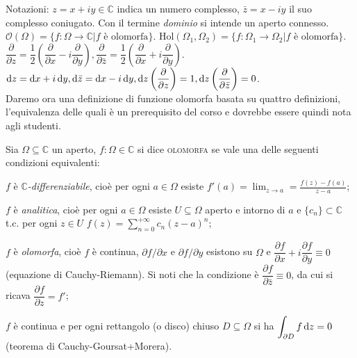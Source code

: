 Notazioni: $z=x+iy \in \mathbb{C}$ indica un numero complesso, $\bar{z}=x-iy$ il suo complesso coniugato. Con il termine \textit{dominio} si intende un aperto connesso. $\mathcal{O}(\Omega)=\{f: \Omega \rightarrow \mathbb{C} | f \text{ è olomorfa} \}$.
$\text{Hol}(\Omega_1, \Omega_2)=\{f: \Omega_1 \rightarrow \Omega_2 | f \text{ è olomorfa} \}$.
$\dfrac{\partial}{\partial z}=\dfrac{1}{2}\left(\dfrac{\partial}{\partial x}-i\dfrac{\partial}{\partial y}\right), \dfrac{\partial}{\partial \bar{z}}=\dfrac{1}{2}\left(\dfrac{\partial}{\partial x}+i\dfrac{\partial}{\partial y}\right)$. \\
$\diff z=\diff x+i\diff y, \diff\bar{z}=\diff x-i\diff y, \diff z\left(\dfrac{\partial}{\partial z}\right)=1, \diff z\left(\dfrac{\partial}{\partial \bar{z}}\right)=0$. \\

Daremo ora una definizione di funzione olomorfa basata su quattro definizioni, l'equivalenza delle quali è un prerequisito del corso e dovrebbe essere quindi nota agli studenti.

\begin{defn}
  Sia $\Omega \subseteq \mathbb{C}$ un aperto, $f: \Omega \in \mathbb{C}$ si dice \textsc{olomorfa} se vale una delle seguenti condizioni equivalenti:
  \begin{nlist}
      \item $f$ è \textit{$\mathbb{C}$-differenziabile}, cioè per ogni $a \in \Omega$ esiste $\displaystyle f'(a)=\lim_{z \rightarrow a}=\frac{f(z)-f(a)}{z-a}$;
      \item $f$ è \textit{analitica}, cioè per ogni $a \in \Omega$ esiste $U \subseteq \Omega$ aperto e intorno di $a$ e $\{c_n\}\subset \mathbb{C}$ t.c. per ogni $z \in U$ $\displaystyle f(z)=\sum_{n=0}^{+\infty} c_n(z-a)^n$;
      \item $f$ è \textit{olomorfa}, cioè $f$ è continua, $\partial f/\partial x$ e $\partial f/\partial y$ esistono su $\Omega$ e $\dfrac{\partial f}{\partial x}+i\dfrac{\partial f}{\partial y} \equiv 0$ (equazione di Cauchy-Riemann).
      Si noti che la condizione è $\dfrac{\partial f}{\partial \bar{z}} \equiv 0$, da cui si ricava $\dfrac{\partial f}{\partial z}=f'$;
      \item $f$ è continua e per ogni rettangolo (o disco) chiuso $D \subseteq \Omega$ si ha $\displaystyle \int_{\partial D} f\mathop{}\!\mathrm{d} z=0$ (teorema di Cauchy-Goursat+Morera).
  \end{nlist}
\end{defn}


